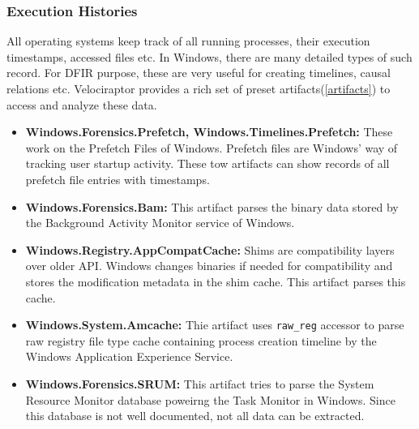 \documentclass[a4paper, 11pt, oneside]{article} %
\begin{document}
\subsubsection{Execution Histories}
All operating systems keep track of all running processes, their execution timestamps, accessed files etc. In Windows, there are many detailed types of such record. For DFIR purpose, these are very useful for creating timelines, causal relations etc. Velociraptor provides a rich set of preset artifacts(\ref{artifacts}) to access and analyze these data.
\begin{itemize}
    \item \textbf{Windows.Forensics.Prefetch, Windows.Timelines.Prefetch:} These work on the Prefetch Files of Windows. Prefetch files are Windows' way of tracking user startup activity. These tow artifacts can show records of all prefetch file entries with timestamps.
    \item \textbf{Windows.Forensics.Bam:} This artifact parses the binary data stored by the Background Activity Monitor service of Windows.
    \item \textbf{Windows.Registry.AppCompatCache:} Shims are compatibility layers over older API. Windows changes binaries if needed for compatibility and stores the modification metadata in the shim cache. This artifact parses this cache.
    \item \textbf{Windows.System.Amcache:} Thie artifact uses \verb|raw_reg| accessor to parse raw registry file type cache containing process creation timeline by the Windows Application Experience Service.
    \item \textbf{Windows.Forensics.SRUM:} This artifact tries to parse the System Resource Monitor database poweirng the Task Monitor in Windows. Since this database is not well documented, not all data can be extracted.
\end{itemize}
\end{document}
